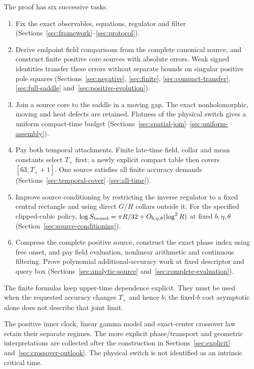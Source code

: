 The proof has six successive tasks.
\begin{enumerate}
\item Fix the exact observables, equations, regulator and filter
(Sections~\ref{sec:framework}--\ref{sec:protocol}).
\item Derive endpoint field comparisons from the complete canonical
source, and construct finite positive core sources with absolute errors.
Weak signed identities transfer these errors without separate bounds on
singular positive pole squares (Sections~\ref{sec:negative},
\ref{sec:finite}, \ref{sec:compact-transfer}, \ref{sec:full-saddle}
and~\ref{sec:positive-evolution}).
\item Join a source core to the saddle in a moving gap. The exact
nonholomorphic, moving and heat defects are retained. Flatness of the
physical switch gives a uniform compact-time budget
(Sections~\ref{sec:spatial-join}--\ref{sec:uniform-assembly}).
\item Pay both temporal attachments. Finite late-time field, collar and
mean constants select $T_+$ first; a newly explicit compact table then
covers $[63,T_++1]$. One source satisfies all finite accuracy demands
(Sections~\ref{sec:temporal-cover}--\ref{sec:all-time}).
\item Improve source conditioning by restricting the inverse regulator
to a fixed central rectangle and using direct $G/H$ collars outside it.
For the specified clipped-cubic policy,
$\log S_{\rm bound}=\pi R/32+O_{b,\eta,\theta}(\log^2R)$ at fixed
$b,\eta,\theta$ (Section~\ref{sec:source-conditioning}).
\item Compress the complete positive source, construct the exact phase
index using free onset, and pay field evaluation, nonlinear arithmetic
and continuous filtering. Prove polynomial additional-accuracy work
at fixed descriptor and query box (Sections~\ref{sec:analytic-source}
and~\ref{sec:complete-evaluation}).
\end{enumerate}
The finite formulas keep upper-time dependence explicit. They must be
used when the requested accuracy changes $T_+$ and hence $b$; the
fixed-$b$ cost asymptotic alone does not describe that joint limit.

The positive inner clock, linear gamma model and exact-center crossover
law retain their separate regimes. The more explicit phase/transport and
geometric interpretations are collected after the construction in
Sections~\ref{sec:explicit} and~\ref{sec:crossover-outlook}. The physical
switch is not identified as an intrinsic critical time.

